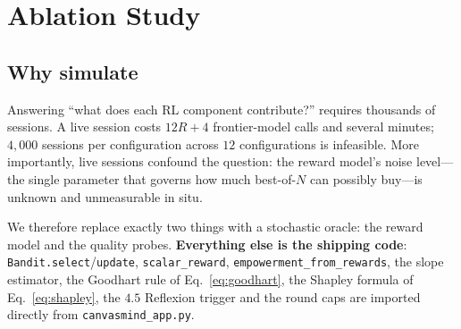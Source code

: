 \documentclass[11pt]{article}
\newcommand{\code}[1]{\texttt{\small #1}}
\newcommand{\file}[1]{\textcolor{accent}{\texttt{\small #1}}}
\theoremstyle{plain}
\theoremstyle{definition}
\begin{document}
\section{Ablation Study}
\label{sec:ablation}
\subsection{Why simulate}
Answering ``what does each RL component contribute?'' requires thousands of
sessions. A live session costs $12R+4$ frontier-model calls and several minutes;
$4{,}000$ sessions per configuration across $12$ configurations is infeasible.
More importantly, live sessions confound the question: the reward model's noise
level---the single parameter that governs how much best-of-$N$ can possibly
buy---is unknown and unmeasurable in situ.

We therefore replace exactly two things with a stochastic oracle: the reward
model and the quality probes. \textbf{Everything else is the shipping code}:
\code{Bandit.select}/\code{update}, \code{scalar\_reward},
\code{empowerment\_from\_rewards}, the slope estimator, the Goodhart rule of
Eq.~\ref{eq:goodhart}, the Shapley formula of Eq.~\ref{eq:shapley}, the $4.5$
Reflexion trigger and the round caps are imported directly from
\file{canvasmind\_app.py}.
\end{document}
